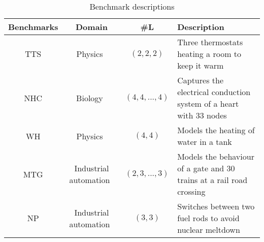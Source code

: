 \begin{table*}
	\centering
	\caption{Benchmark descriptions
	\label{tab:benchmarks}}
\begin{tabular}{ | c | c | c | l | } \hline
\textbf{Benchmarks}
	& \textbf{Domain} 
	& \textbf{\#L } 
	& \textbf{Description} \\ \hline

	\acf{TTS}
		& Physics~\cite{Pedro2005}
		& $(2, 2, 2)$
		& Three thermostats heating a room to keep it warm\\ \hline
		
	\acf{NHC}
		& Biology~\cite{chen201487}
		& $(4, 4, ..., 4)$
		& Captures the electrical conduction system of a heart with $33$ nodes\\ \hline

	\acf{WH}
		& Physics~\cite{raskin05}
		& $(4, 4)$
		& Models the heating of water in a tank \\ \hline
		
	\acf{MTG}  
		& Industrial automation~\cite{Costello2013}
		& $(2, 3, ..., 3)$
		& Models the behaviour of a gate and $30$ trains at a rail road crossing\\ \hline
		
	\acf{NP}
		& Industrial automation~\cite{alur2015book}
		& $(3, 3)$
		& Switches between two fuel rods to avoid nuclear meltdown\\ \hline
	
	
 \end{tabular}
 \end{table*}